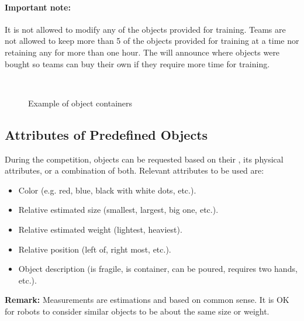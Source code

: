 \paragraph*{Important note:} It is not allowed to modify any of the objects provided for training.
Teams are not allowed to keep more than 5 of the objects provided for training at a time nor retaining any for more than one hour. The  will announce where objects were bought so teams can buy their own if they require more time for training.

\begin{figure}[H]
	\centering
	~
	~
	\caption{Example of object containers}
	\label{fig:scenario_containers}
\end{figure}

\subsection{Attributes of Predefined Objects}
\label{rule:scenario_objects_attributes}
During the competition, objects can be requested based on their , its physical attributes, or a combination of both.
Relevant attributes to be used are:
\begin{itemize}
	\item Color (e.g. red, blue, black with white dots, etc.).
	\item Relative estimated size (smallest, largest, big one, etc.).
	\item Relative estimated weight (lightest, heaviest).
	\item Relative position (left of, right most, etc.).
	\item Object description (is fragile, is container, can be poured, requires two hands, etc.).
\end{itemize}

\noindent\textbf{Remark:} Measurements are estimations and based on common sense. It is OK for robots to consider similar objects to be about the same size or weight.

%
%

